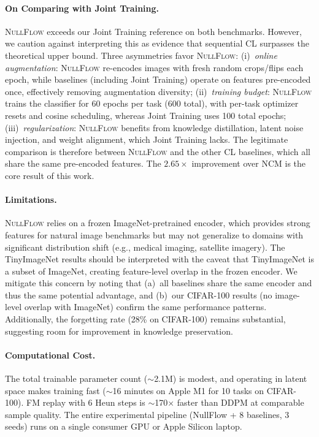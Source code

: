 \documentclass[10pt,twocolumn,letterpaper]{article}
\newcommand{\ours}{\textsc{NullFlow}}
\begin{document}
\paragraph{On Comparing with Joint Training.}
\ours{} exceeds our Joint Training reference on both benchmarks. However, we caution against interpreting this as evidence that sequential CL surpasses the theoretical upper bound. Three asymmetries favor \ours{}: (i)~\textit{online augmentation}: \ours{} re-encodes images with fresh random crops/flips each epoch, while baselines (including Joint Training) operate on features pre-encoded once, effectively removing augmentation diversity; (ii)~\textit{training budget}: \ours{} trains the classifier for 60 epochs per task (600 total), with per-task optimizer resets and cosine scheduling, whereas Joint Training uses 100 total epochs; (iii)~\textit{regularization}: \ours{} benefits from knowledge distillation, latent noise injection, and weight alignment, which Joint Training lacks. The legitimate comparison is therefore between \ours{} and the other CL baselines, which all share the same pre-encoded features. The $2.65\times$ improvement over NCM is the core result of this work.

\paragraph{Limitations.}
\ours{} relies on a frozen ImageNet-pretrained encoder, which provides strong features for natural image benchmarks but may not generalize to domains with significant distribution shift (e.g., medical imaging, satellite imagery). The TinyImageNet results should be interpreted with the caveat that TinyImageNet is a subset of ImageNet, creating feature-level overlap in the frozen encoder. We mitigate this concern by noting that (a)~all baselines share the same encoder and thus the same potential advantage, and (b)~our CIFAR-100 results (no image-level overlap with ImageNet) confirm the same performance patterns. Additionally, the forgetting rate (28\% on CIFAR-100) remains substantial, suggesting room for improvement in knowledge preservation.

\paragraph{Computational Cost.}
The total trainable parameter count ($\sim$2.1M) is modest, and operating in latent space makes training fast ($\sim$16 minutes on Apple M1 for 10 tasks on CIFAR-100). FM replay with 6 Heun steps is $\sim$170$\times$ faster than DDPM at comparable sample quality. The entire experimental pipeline (NullFlow + 8 baselines, 3 seeds) runs on a single consumer GPU or Apple Silicon laptop.
\end{document}
